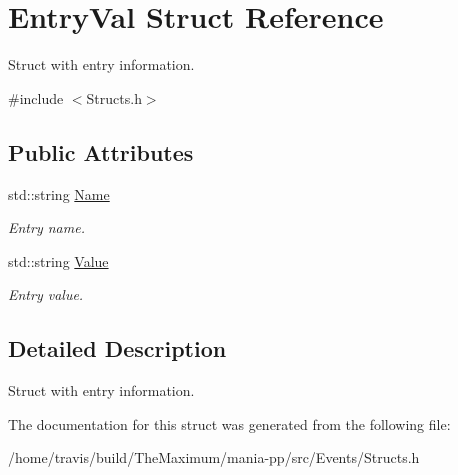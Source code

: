 \hypertarget{structEntryVal}{\section{Entry\-Val Struct Reference}
\label{structEntryVal}
}


Struct with entry information.  




{\ttfamily \#include $<$Structs.\-h$>$}

\subsection*{Public Attributes}
\begin{DoxyCompactItemize}
\item 
\hypertarget{structEntryVal_a3fdfc0956cb158d36bff09687c8f577e}{std\-::string \hyperlink{structEntryVal_a3fdfc0956cb158d36bff09687c8f577e}{Name}}\label{structEntryVal_a3fdfc0956cb158d36bff09687c8f577e}

\begin{DoxyCompactList}\small\item\em Entry name. \end{DoxyCompactList}\item 
\hypertarget{structEntryVal_a77a7420daaf63bf984aa0c4c0f2032a7}{std\-::string \hyperlink{structEntryVal_a77a7420daaf63bf984aa0c4c0f2032a7}{Value}}\label{structEntryVal_a77a7420daaf63bf984aa0c4c0f2032a7}

\begin{DoxyCompactList}\small\item\em Entry value. \end{DoxyCompactList}\end{DoxyCompactItemize}


\subsection{Detailed Description}
Struct with entry information. 

The documentation for this struct was generated from the following file\-:\begin{DoxyCompactItemize}
\item 
/home/travis/build/\-The\-Maximum/mania-\/pp/src/\-Events/Structs.\-h\end{DoxyCompactItemize}
